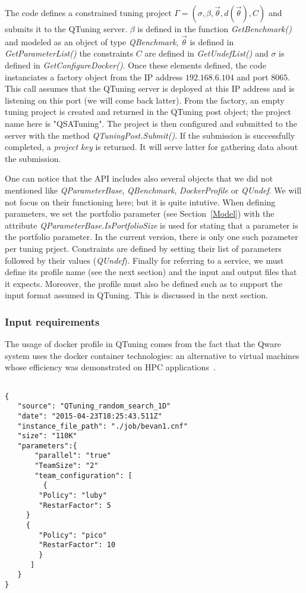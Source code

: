 \documentclass[10pt, conference, compsocconf]{IEEEtran}
\begin{document}
The code defines a constrained tuning project   $ \Gamma = (\sigma, \beta, \vec{\theta}, d(\vec{\theta}), C)$ and submits it 
to the QTuning server. 
$\beta$ is defined in the function {\it GetBenchmark()} and modeled as an object of type {\it QBenchmark}, $\vec{\theta}$ 
is defined in {\it GetParameterList()} the constraints $C$ are defined in {\it GetUndefList()} and 
$\sigma$ is defined in {\it GetConfigureDocker()}. Once these elements defined, the code instanciates a factory 
object from the IP address $192.168.6.104$ and port $8065$. This call assumes that the QTuning server is deployed at this 
IP address and is listening on this port (we will come back latter). From the factory, an empty tuning project is created 
and returned in the  QTuning post object; the project name here is "QSATuning". The project is then configured and 
 submitted to the server with the method {\it QTuningPost.Submit()}. If the submission is successfully completed, 
a {\it project key} is returned. It will serve latter for gathering data about the submission.

One can notice that the API includes also several objects that we did not mentioned like {\it QParameterBase}, {\it QBenchmark},
{\it DockerProfile}  or {\it QUndef}. 
We will not focus on their functioning here; but it is quite intutive. When defining parameters, we set the portfolio parameter 
(see Section~\ref{Model}) with the attribute {\it QParameterBase.IsPortfolioSize} is used for stating that a parameter is the portfolio parameter.
In the current version, there is only one such parameter per tuning prject. Constraints are defined by setting their list of parameters 
followed by their values ({\it QUndef}). Finally for referring to a service, we must define its profile name (see the next section) 
and the input and output files that it expects. Moreover, the profile must also be defined such as to support the input format 
assumed in QTuning. This is discussed in the next section.

\subsubsection{Input requirements}
The usage of docker profile in QTuning comes from the fact that the Qware system uses the docker container technologies:  
an alternative to virtual machines whose efficiency was demonstrated on HPC applications~\cite{DBLP:conf/ispass/FelterFRR15}.
\begin{lstlisting}[caption=Json input data representation in QTuning, label=lst:rep]

{
   "source": "QTuning_random_search_1D"	
   "date": "2015-04-23T18:25:43.511Z"						
   "instance_file_path": "./job/bevan1.cnf"
   "size": "110K" 	
   "parameters":{
       "parallel": "true"
       "TeamSize": "2"
       "team_configuration": [
         {
	    "Policy": "luby"
	    "RestarFactor": 5
	 }
	 {
	    "Policy": "pico"
	    "RestarFactor": 10
        }
      ]
   }
}
\end{lstlisting}
\end{document}
